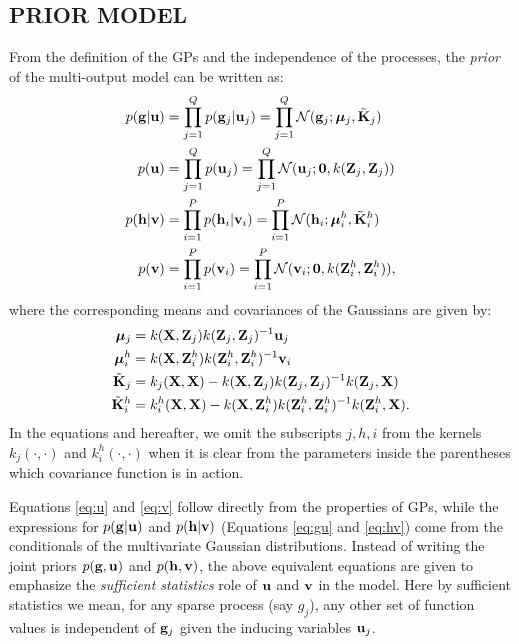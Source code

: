 \subsection{PRIOR MODEL}
From the definition of the GPs and the independence of the processes, 
the \emph{prior} of the multi-output model can be written as:
\begin{align}
\label{eq:gu}
p(\mathbf{g} | \mathbf{u}) &= \prod_{j=1}^Q p(\mathbf{g}_j | \mathbf{u}_j) = \prod_{j=1}^Q \mathcal{N}(\mathbf{g}_j; \boldsymbol{\mu}_j, \tilde{\mathbf{K}}_j )\\
\label{eq:u}
p(\mathbf{u}) &= \prod_{j=1}^Q p(\mathbf{u}_j) = \prod_{j=1}^Q \mathcal{N}(\mathbf{u}_j; \mathbf{0}, k(\mathbf{Z}_j, \mathbf{Z}_j)) \\
\label{eq:hv}
p(\mathbf{h} | \mathbf{v}) &= \prod_{i=1}^P p(\mathbf{h}_i | \mathbf{v}_i) = \prod_{i=1}^P \mathcal{N}(\mathbf{h}_i; \boldsymbol{\mu}^h_i, \tilde{\mathbf{K}}^h_i)\\
\label{eq:v}
p(\mathbf{v}) &= \prod_{i=1}^P p(\mathbf{v}_i) = \prod_{i=1}^P \mathcal{N}(\mathbf{v}_i; \mathbf{0}, k(\mathbf{Z}^h_i, \mathbf{Z}^h_i)),
\end{align}
where the corresponding means and covariances of the Gaussians are given by:
\begin{align}
 \boldsymbol{\mu}_j &= k(\mathbf{X},\mathbf{Z}_j)k(\mathbf{Z}_j,\mathbf{Z}_j)^{-1}\mathbf{u}_j \\
\boldsymbol{\mu}^h_i &= k(\mathbf{X},\mathbf{Z}^h_i)k(\mathbf{Z}^h_i,\mathbf{Z}^h_i)^{-1}\mathbf{v}_i \\
\tilde{\mathbf{K}}_j &= k_j(\mathbf{X},\mathbf{X}) - k(\mathbf{X},\mathbf{Z}_j)k(\mathbf{Z}_j,\mathbf{Z}_j)^{-1}k(\mathbf{Z}_j,\mathbf{X}) \\
\tilde{\mathbf{K}}^h_i &= k^h_i(\mathbf{X},\mathbf{X}) - k(\mathbf{X},\mathbf{Z}^h_i)k(\mathbf{Z}^h_i,\mathbf{Z}^h_i)^{-1}k(\mathbf{Z}^h_i,\mathbf{X}).
\end{align}
In the equations and hereafter, we omit the subscripts $j,h,i$ from the kernels $k_j(\cdot,\cdot)$ and $k^h_i(\cdot,\cdot)$ when it is clear from the parameters inside the parentheses which covariance function is in action.

Equations \eqref{eq:u} and \eqref{eq:v} follow directly from the properties of GPs, while the expressions for $p(\mathbf{g}|\mathbf{u})$ and $p(\mathbf{h}|\mathbf{v})$ (Equations  \eqref{eq:gu} and \eqref{eq:hv}) come from the conditionals of the multivariate Gaussian distributions.
Instead of writing the joint priors $p(\mathbf{g},\mathbf{u})$ and $p(\mathbf{h},\mathbf{v})$, the above equivalent equations are given to emphasize the \emph{sufficient statistics} role of $\mathbf{u}$ and $\mathbf{v}$ in the model.
Here by sufficient statistics we mean, for any sparse process (say $g_j$), any other set of function values is 
independent of $\mathbf{g}_j$ given the inducing variables $\mathbf{u}_j$.
%
